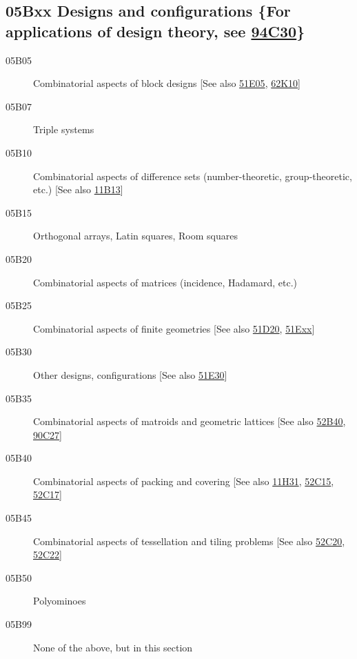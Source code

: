 \documentclass[letterpaper]{article}
\begin{document}
\subsection*{05Bxx  Designs and configurations \{For applications of design theory, see \hyperref[94C30]{94C30}\} }\label{05Bxx}
\begin{description}  
\item [05B05]\label{05B05} Combinatorial aspects of block designs [See also \hyperref[51E05]{51E05}, \hyperref[62K10]{62K10}]
\item [05B07]\label{05B07} Triple systems
\item [05B10]\label{05B10} Combinatorial aspects of difference sets (number-theoretic, group-theoretic, etc.) [See also \hyperref[11B13]{11B13}]
\item [05B15]\label{05B15} Orthogonal arrays, Latin squares, Room squares
\item [05B20]\label{05B20} Combinatorial aspects of matrices (incidence, Hadamard, etc.)
\item [05B25]\label{05B25} Combinatorial aspects of finite geometries [See also \hyperref[51D20]{51D20}, \hyperref[51Exx]{51Exx}]
\item [05B30]\label{05B30} Other designs, configurations [See also \hyperref[51E30]{51E30}]
\item [05B35]\label{05B35} Combinatorial aspects of matroids and geometric lattices [See also \hyperref[52B40]{52B40}, \hyperref[90C27]{90C27}]
\item [05B40]\label{05B40} Combinatorial aspects of packing and covering [See also \hyperref[11H31]{11H31}, \hyperref[52C15]{52C15}, \hyperref[52C17]{52C17}]
\item [05B45]\label{05B45} Combinatorial aspects of tessellation and tiling problems [See also \hyperref[52C20]{52C20}, \hyperref[52C22]{52C22}]
\item [05B50]\label{05B50} Polyominoes
\item [05B99]\label{05B99} None of the above, but in this section
\end{description}
\end{document}
